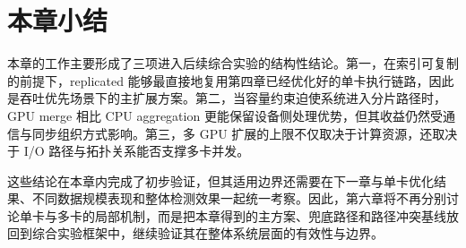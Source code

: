 \section{本章小结}

本章的工作主要形成了三项进入后续综合实验的结构性结论。第一，在索引可复制的前提下，replicated 能够最直接地复用第四章已经优化好的单卡执行链路，因此是吞吐优先场景下的主扩展方案。第二，当容量约束迫使系统进入分片路径时，GPU merge 相比 CPU aggregation 更能保留设备侧处理优势，但其收益仍然受通信与同步组织方式影响。第三，多 GPU 扩展的上限不仅取决于计算资源，还取决于 I/O 路径与拓扑关系能否支撑多卡并发。

这些结论在本章内完成了初步验证，但其适用边界还需要在下一章与单卡优化结果、不同数据规模表现和整体检测效果一起统一考察。因此，第六章将不再分别讨论单卡与多卡的局部机制，而是把本章得到的主方案、兜底路径和路径冲突基线放回到综合实验框架中，继续验证其在整体系统层面的有效性与边界。
